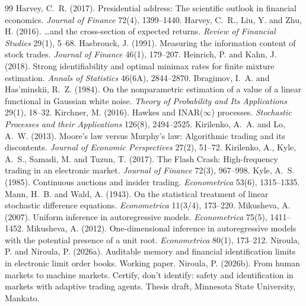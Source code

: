 \documentclass[12pt]{article}
\theoremstyle{definition}
\theoremstyle{remark}
\begin{document}
\begin{thebibliography}{99}
 Harvey, C.~R. (2017). Presidential address: The scientific outlook in financial economics. \emph{Journal of Finance} 72(4), 1399--1440.
 Harvey, C.~R., Liu, Y. and Zhu, H. (2016). \ldots and the cross-section of expected returns. \emph{Review of Financial Studies} 29(1), 5--68.
 Hasbrouck, J. (1991). Measuring the information content of stock trades. \emph{Journal of Finance} 46(1), 179--207.
 Heinrich, P. and Kahn, J. (2018). Strong identifiability and optimal minimax rates for finite mixture estimation. \emph{Annals of Statistics} 46(6A), 2844--2870.
 Ibragimov, I.~A. and Has'minskii, R.~Z. (1984). On the nonparametric estimation of a value of a linear functional in Gaussian white noise. \emph{Theory of Probability and Its Applications} 29(1), 18--32.
 Kirchner, M. (2016). Hawkes and INAR($\infty$) processes. \emph{Stochastic Processes and their Applications} 126(8), 2494--2525.
 Kirilenko, A.~A. and Lo, A.~W. (2013). Moore's law versus Murphy's law: Algorithmic trading and its discontents. \emph{Journal of Economic Perspectives} 27(2), 51--72.
 Kirilenko, A., Kyle, A.~S., Samadi, M. and Tuzun, T. (2017). The Flash Crash: High-frequency trading in an electronic market. \emph{Journal of Finance} 72(3), 967--998.
 Kyle, A.~S. (1985). Continuous auctions and insider trading. \emph{Econometrica} 53(6), 1315--1335.
 Mann, H.~B. and Wald, A. (1943). On the statistical treatment of linear stochastic difference equations. \emph{Econometrica} 11(3/4), 173--220.
 Mikusheva, A. (2007). Uniform inference in autoregressive models. \emph{Econometrica} 75(5), 1411--1452.
 Mikusheva, A. (2012). One-dimensional inference in autoregressive models with the potential presence of a unit root. \emph{Econometrica} 80(1), 173--212.
 Niroula, P. and Niroula, P. (2026a). Auditable memory and financial identification limits in electronic limit order books. Working paper.
 Niroula, P. (2026b). From human markets to machine markets. Certify, don't identify: safety and identification in markets with adaptive trading agents. Thesis draft, Minnesota State University, Mankato.

\end{thebibliography}
\end{document}
